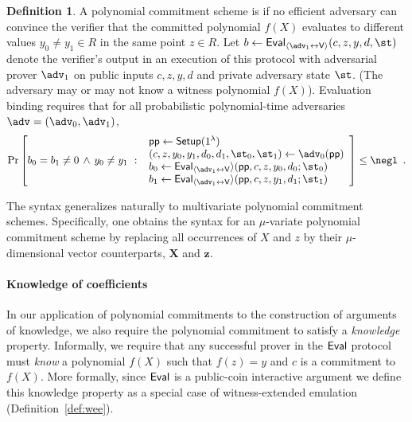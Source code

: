 \documentclass{article}
\theoremstyle{definition}
\newtheorem{definition}{Definition}
\begin{document}
\begin{definition}
A polynomial commitment scheme is  if no efficient adversary can convince the verifier that the committed polynomial $f(X)$ evaluates to different values $y_0 \neq y_1 \in R$ in the same point $z \in R$. Let $b \gets \pro{Eval}_{\langle \adv_1 \leftrightarrow \mathsf{V}\rangle}(c, z, y, d, \st)$ denote the verifier's output in an execution of this protocol with adversarial prover $\adv_1$ on public inputs $c, z, y, d$ and private adversary state $\st$. (The adversary may or may not know a witness polynomial $f(X)$). Evaluation binding requires that for all probabilistic polynomial-time adversaries $\adv = (\adv_0, \adv_1)$,
\[
    \Pr\left[
         b_0 = b_1 \neq 0 \, \wedge \, y_0 \neq y_1 \ 
         : \
       \begin{array}{l}
            \params \gets \pro{Setup}(1^\lambda) \\
            (c, z, y_0, y_1, d_0, d_1, \st_0, \st_1) \gets \adv_0(\params) \\
            b_0 \gets \pro{Eval}_{\langle \adv_1 \leftrightarrow \mathsf{V}} \rangle(\params, c, z, y_0, d_0; \st_0) \\
            b_1 \gets \pro{Eval}_{\langle \adv_1 \leftrightarrow \mathsf{V}} \rangle(\params, c, z, y_1, d_1; \st_1) \\
        \end{array}
    \right] \leq \negl \enspace .
\]
\end{definition}

The syntax generalizes naturally to multivariate polynomial commitment schemes. Specifically, one obtains the syntax for an $\mu$-variate polynomial commitment scheme by replacing all occurrences of $X$ and $z$ by their $\mu$-dimensional vector counterparts, $\mathbf{X}$ and $\mathbf{z}$.

\paragraph{Knowledge of coefficients} In our application of polynomial commitments to the construction of arguments of knowledge, we also require the polynomial commitment to satisfy a \emph{knowledge} property. Informally, we require that any successful prover in the $\textsf{{Eval}}$ protocol must \emph{know} a polynomial $f(X)$ such that $f(z) = y$ and $c$ is a commitment to $f(X)$. More formally, since $\textsf{{Eval}}$ is a public-coin interactive argument we define this knowledge property as a special case of witness-extended emulation (Definition~\ref{def:wee}). 
\end{document}
